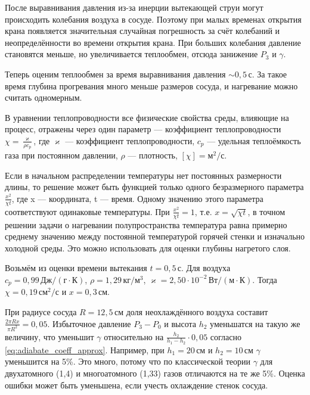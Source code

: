 \documentclass[12pt]{article}
\begin{document}
	После выравнивания давления из-за инерции вытекающей струи могут происходить колебания воздуха в сосуде. Поэтому при малых временах открытия крана появляется значительная случайная погрешность за счёт колебаний и неопределённости во времени открытия крана. При больших колебания давление становятся меньше, но увеличивается теплообмен, отсюда занижение $P_3$ и $\gamma$.
	
	 Теперь оценим теплообмен за время выравнивания давления $\sim 0{,}5\,\text{с}$. За такое время глубина прогревания много меньше размеров сосуда, и нагревание можно считать одномерным.
	
	В уравнении теплопроводности все физические свойства среды, влияющие на процесс, отражены через один параметр --- коэффициент теплопроводности $\chi=\frac{\varkappa}{\rho c_p}$, где $\varkappa$ --- коэффициент теплопроводности, $c_p$ --- удельная теплоёмкость газа при постоянном давлении, $\rho$ --- плотность, $\left[ \chi \right] = \text{м}^2/\text{с}$.
	
	Если в начальном распределении температуры нет постоянных размерности длины, то решение может быть функцией только одного безразмерного параметра $\frac{x^2}{\chi t}$, где x --- координата, t --- время. Одному значению этого параметра соответствуют одинаковые температуры. При $\frac{x^2}{\chi t}=1$, т.е. $x=\sqrt{\chi t}$, в точном решении задачи о нагревании полупространства температура равна примерно среднему значению между постоянной температурой горячей стенки и изначально холодной среды. Это можно использовать для оценки глубины нагретого слоя.
	
	Возьмём из оценки времени вытекания $t=0{,}5\,\text{с}$. Для воздуха $c_p=0{,}99\,\text{Дж}/\left( \text{г} \cdot \text{К} \right)$, $\rho=1{,}29\,\text{кг}/\text{м}^3$, $\varkappa=2{,}50\cdot 10^{-2} \,\text{Вт}/\left( \text{м} \cdot \text{К} \right)$. Тогда $\chi=0{,}19\,\text{см}^2/\text{с}$ и $x=0{,}3\,\text{см}$.
	
	При радиусе сосуда $R=12{,}5\,\text{см}$ доля неохлаждённого воздуха составит $\frac{2\pi Rx}{\pi R^2}=0{,}05$. Избыточное давление $P_3-P_0$ и высота $h_2$ уменьшатся на такую же величину, что уменьшит $\gamma$ относительно на $\frac{h_2}{h_1-h_2}\cdot 0{,}05$ согласно \eqref{eq:adiabate_coeff_approx}. Например, при $h_1=20\,\text{см}$ и $h_2=10\,\text{см}$ $\gamma$ уменьшится на 5\%. Это много, потому что по классической теории $\gamma$ для двухатомного (1,4) и многоатомного (1,33) газов отличаются на те же 5\%. Оценка ошибки может быть уменьшена, если учесть охлаждение стенок сосуда.
	
\end{document}
